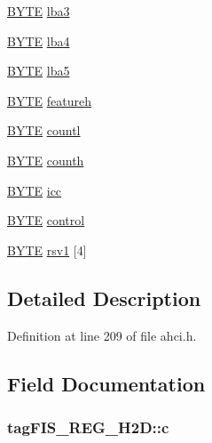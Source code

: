 \begin{DoxyCompactItemize}
\item 
\hyperlink{ahci_8h_aae9749d96e15ccb4f482dd5f55d98f9b}{B\+Y\+TE} \hyperlink{structtagFIS__REG__H2D_aa5f23b8b3081eb875e73bf008e14c84d}{lba3}
\item 
\hyperlink{ahci_8h_aae9749d96e15ccb4f482dd5f55d98f9b}{B\+Y\+TE} \hyperlink{structtagFIS__REG__H2D_a5083158d5ff8af8fa49c023e8549d00c}{lba4}
\item 
\hyperlink{ahci_8h_aae9749d96e15ccb4f482dd5f55d98f9b}{B\+Y\+TE} \hyperlink{structtagFIS__REG__H2D_aa8295bb116158a4e6505dfc97b180a3f}{lba5}
\item 
\hyperlink{ahci_8h_aae9749d96e15ccb4f482dd5f55d98f9b}{B\+Y\+TE} \hyperlink{structtagFIS__REG__H2D_ae425a96e1eba636b2e840de7c42873d8}{featureh}
\item 
\hyperlink{ahci_8h_aae9749d96e15ccb4f482dd5f55d98f9b}{B\+Y\+TE} \hyperlink{structtagFIS__REG__H2D_a9b662bfeeb000dc26a93a0ca1d130412}{countl}
\item 
\hyperlink{ahci_8h_aae9749d96e15ccb4f482dd5f55d98f9b}{B\+Y\+TE} \hyperlink{structtagFIS__REG__H2D_ac86100e381bacf65c1562f89be035202}{counth}
\item 
\hyperlink{ahci_8h_aae9749d96e15ccb4f482dd5f55d98f9b}{B\+Y\+TE} \hyperlink{structtagFIS__REG__H2D_a0ee8ac8b5b507bead68ea815a73d2634}{icc}
\item 
\hyperlink{ahci_8h_aae9749d96e15ccb4f482dd5f55d98f9b}{B\+Y\+TE} \hyperlink{structtagFIS__REG__H2D_ab20defc1886221286a5b05a8419eb79b}{control}
\item 
\hyperlink{ahci_8h_aae9749d96e15ccb4f482dd5f55d98f9b}{B\+Y\+TE} \hyperlink{structtagFIS__REG__H2D_aeeff6159bfdf330d517a372b9c600e05}{rsv1} \mbox{[}4\mbox{]}
\end{DoxyCompactItemize}


\subsection{Detailed Description}


Definition at line 209 of file ahci.\+h.



\subsection{Field Documentation}
\subsubsection[{\texorpdfstring{c}{c}}]{ tag\+F\+I\+S\+\_\+\+R\+E\+G\+\_\+\+H2\+D\+::c}\hypertarget{structtagFIS__REG__H2D_af3d7ccfa012a57fabf91a0e37d6af7aa}{}\label{structtagFIS__REG__H2D_af3d7ccfa012a57fabf91a0e37d6af7aa}


